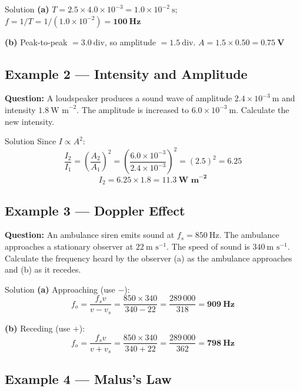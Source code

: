 \begin{examplebox}{Solution}
\textbf{(a)} $T = 2.5 \times 4.0 \times 10^{-3} = 1.0\times10^{-2}\ \text{s}$; \quad
$f = 1/T = 1/(1.0\times10^{-2}) = \mathbf{100\ \text{Hz}}$

\vspace{0.3em}
\textbf{(b)} Peak-to-peak $= 3.0\ \text{div}$, so amplitude $= 1.5\ \text{div}$.
$A = 1.5 \times 0.50 = \mathbf{0.75\ \text{V}}$
\end{examplebox}

\subsection*{Example 2 --- Intensity and Amplitude}

\textbf{Question:} A loudspeaker produces a sound wave of amplitude $2.4\times10^{-3}\ \text{m}$ and intensity $1.8\ \text{W m}^{-2}$. The amplitude is increased to $6.0\times10^{-3}\ \text{m}$. Calculate the new intensity.

\begin{examplebox}{Solution}
Since $I \propto A^2$:
$$\frac{I_2}{I_1} = \left(\frac{A_2}{A_1}\right)^2 = \left(\frac{6.0\times10^{-3}}{2.4\times10^{-3}}\right)^2 = (2.5)^2 = 6.25$$
$$I_2 = 6.25 \times 1.8 = \mathbf{11.3\ \text{W m}^{-2}}$$
\end{examplebox}

\subsection*{Example 3 --- Doppler Effect}

\textbf{Question:} An ambulance siren emits sound at $f_s = 850\ \text{Hz}$. The ambulance approaches a stationary observer at $22\ \text{m s}^{-1}$. The speed of sound is $340\ \text{m s}^{-1}$. Calculate the frequency heard by the observer (a) as the ambulance approaches and (b) as it recedes.

\begin{examplebox}{Solution}
\textbf{(a)} Approaching (use $-$):
$$f_o = \frac{f_s v}{v - v_s} = \frac{850 \times 340}{340 - 22} = \frac{289\,000}{318} = \mathbf{909\ \text{Hz}}$$

\textbf{(b)} Receding (use $+$):
$$f_o = \frac{f_s v}{v + v_s} = \frac{850 \times 340}{340 + 22} = \frac{289\,000}{362} = \mathbf{798\ \text{Hz}}$$
\end{examplebox}

\subsection*{Example 4 --- Malus's Law}

